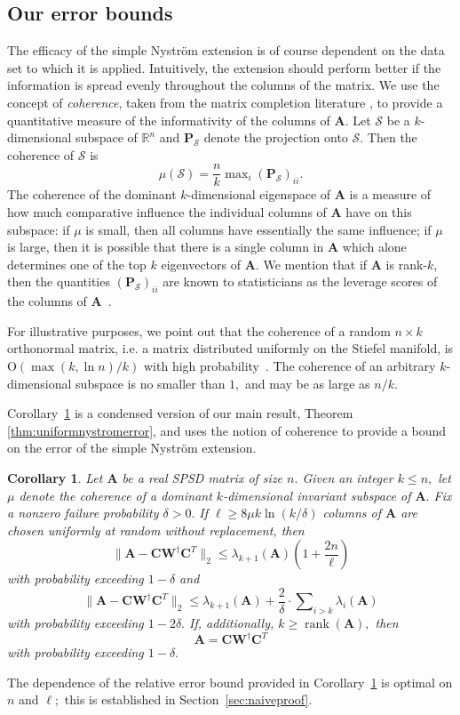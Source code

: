 \documentclass[11pt,letterpaper,twoside,reqno,nosumlimits]{amsart}
\def\pinv{\dagger}
\def\transp{T}
\newcommand{\mat}[1]{\ensuremath{\mathbf{#1}}}
\newcommand{\R}{\ensuremath{\mathbb{R}}}
\newcommand{\snorm}[1]{\ensuremath{\big\|#1\big\|_2}}
\DeclareMathOperator{\rank}{rank}
\newtheorem{cor}{Corollary}
\theoremstyle{remark}
\begin{document}
\subsection{Our error bounds}The efficacy of the simple Nystr\"om extension is of course dependent on the data set to which it is applied. Intuitively, the extension should perform better if the information is spread evenly throughout the columns of the matrix. We use the concept of \emph{coherence}, taken from the matrix completion literature \cite{CR09}, to	provide a quantitative measure of the informativity of the columns of $\mat{A}.$ Let $\mathcal{S}$ be a $k$-dimensional subspace of $\R^n$ and $\mat{P}_{\mathcal{S}}$ denote the projection onto $\mathcal{S}.$ Then the coherence of $\mathcal{S}$ is
\[
 \mu(\mathcal{S}) = \frac{n}{k} \max\nolimits_i (\mat{P}_{\mathcal{S}})_{ii}.
\]
The coherence of the dominant $k$-dimensional eigenspace of $\mat{A}$ is a measure of how much comparative influence the individual columns of $\mat{A}$ have on this subspace: if $\mu$ is small, then all columns have essentially the same influence; if $\mu$ is large, then it is possible that there is a single column in $\mat{A}$ which alone determines one of the top $k$ eigenvectors of $\mat{A}.$ We mention that if $\mat{A}$ is rank-$k$, then the quantities $(\mat{P}_{\mathcal{S}})_{ii}$ are known to statisticians as the leverage scores of the columns of $\mat{A}$~\cite{DM10}.

For illustrative purposes, we point out that the coherence of a random $n \times k$ orthonormal matrix, i.e. a matrix distributed uniformly on the Stiefel manifold, is $\mathrm{O}(\max(k, \ln n)/k)$ with high probability~\cite[Lemma 2.2]{CR09}. The coherence of an arbitrary $k$-dimensional subspace is no smaller than $1,$ and may be as large as $n/k.$ 

Corollary~\ref{cor:simpleuniformnystromerror} is a condensed version of our main result, Theorem \ref{thm:uniformnystromerror}, and uses the notion of coherence to provide a bound on the error of the simple Nystr\"om extension. 

\begin{cor}
 Let $\mat{A}$ be a real SPSD matrix of size $n.$ Given an integer $k \leq n,$ let
$\mu$ denote the coherence of a dominant  $k$-dimensional invariant subspace of $\mat{A}.$
Fix a nonzero failure probability $\delta > 0.$ If $\ell \geq 8 \mu k \ln(k/\delta)$ columns of $\mat{A}$ are chosen uniformly at random without replacement, then 
\[
\snorm{\mat{A} - \mat{C} \mat{W}^\pinv \mat{C}^\transp} \leq \lambda_{k+1}(\mat{A}) \left(1 + \frac{2n}{\ell} \right) 
\]
with probability exceeding $1-\delta$ and
\[
 \snorm{\mat{A} - \mat{C} \mat{W}^\pinv \mat{C}^\transp} \leq \lambda_{k+1}(\mat{A}) + \frac{2}{\delta} \cdot \sum\nolimits_{i>k}\lambda_i(\mat{A})
\]
with probability exceeding $1 - 2\delta.$ If, additionally, $k \geq \rank(\mat{A}),$ then
\[
 \mat{A} = \mat{C} \mat{W}^\pinv \mat{C}^\transp
\]
with probability exceeding $1-\delta.$


\label{cor:simpleuniformnystromerror}
\end{cor}
The dependence of the relative error bound provided in Corollary~\ref{cor:simpleuniformnystromerror} is optimal on $n$ and $\ell;$ this is established in Section~\ref{sec:naiveproof}.
\end{document}
